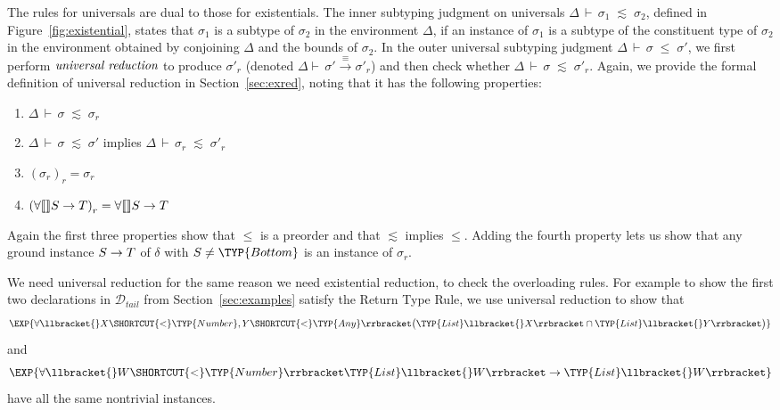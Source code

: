 \documentclass[10pt]{sigplanconf}
\newcommand{\leinner}{\ensuremath{\lesssim}}
\newcommand{\arrowtype}[2]{\mbox{\ensuremath{{#1} \rightarrow {#2}}}}
\newcommand{\ob}[1]{\ensuremath{\llbracket {#1} \rrbracket}}
\newcommand{\D}{\ensuremath{\mathcal{D}}}
\newcommand{\unitype}[2][\Delta]{\ensuremath{\forall\ob{#1}{#2}}}
\newcommand{\reduce}[1]{\ensuremath{{#1}_r}}
\newcommand{\Bottom}{\TYP{Bottom}}
\newcommand{\eqred}{\overset{\equiv}{\longrightarrow}}
\newcommand{\jgtemplate}[4][\Delta]{\ensuremath{{#1}\,\vdash\,{#2}\;{#3}\;{#4}}}
\newcommand{\jle}[3][\Delta]{\jgtemplate[#1]{#2}{\le}{#3}}
\newcommand{\jleinner}[3][\Delta]{\jgtemplate[#1]{#2}{\leinner}{#3}}
\newcommand{\jtred}[2]{\ensuremath{\Delta \vdash\,{#1} \eqred {#2}}}
\begin{document}
The rules for universals are dual to those for existentials. The inner subtyping judgment on universals $\jleinner{\sigma_1}{\sigma_2}$, defined in
Figure~\ref{fig:existential},
states that $\sigma_1$ is a subtype
of $\sigma_2$ in the environment $\Delta$, if an instance of $\sigma_1$ is a subtype of the constituent type of $\sigma_2$ in the environment obtained by conjoining $\Delta$ and the bounds of $\sigma_2$. In
the outer universal subtyping judgment $\jle{\sigma}{\sigma'}$,
we first perform $\emph{universal reduction}$ to produce $\reduce{\sigma'}$ 
(denoted \jtred{\sigma'}{\reduce{\sigma'}})
and then check whether $\jleinner{\sigma}{\reduce{\sigma'}}$. 
Again, 
we provide the formal definition of universal reduction in Section~\ref{sec:exred}, 
noting that it has the following properties:
\begin{enumerate}
\item $\jleinner{\sigma}{\reduce{\sigma}}$
\item $\jleinner{\sigma}{\sigma'}$ implies $\jleinner{\reduce{\sigma}}{\reduce{\sigma'}}$
\item $\reduce{(\reduce{\sigma})} = \reduce{\sigma}$
\item $\reduce{(\unitype[]{\arrowtype{S}{T}})} = \unitype[]{\arrowtype{S}{T}}$
\end{enumerate}
Again the first three properties show that $\le$ is a preorder and that $\leinner$ implies $\le$.
Adding the fourth property lets us show that any ground instance $\arrowtype{S}{T}$ of $\delta$ with $S \neq \Bottom$ is an instance of $\reduce{\sigma}$.

We need universal reduction for the same reason we need existential reduction, to check the overloading rules. For example to show the first two declarations in $\D_{\mathit{tail}}$
from Section~\ref{sec:examples} satisfy the Return Type Rule, we use universal reduction to show that
\[\EXP{\forall\llbracket{}X\SHORTCUT{<}\TYP{Number},Y\SHORTCUT{<}\TYP{Any}\rrbracket\bigl(\TYP{List}\llbracket{}X\rrbracket \cap \TYP{List}\llbracket{}Y\rrbracket\bigr)}\]
and
\[\EXP{\forall\llbracket{}W\SHORTCUT{<}\TYP{Number}\rrbracket\TYP{List}\llbracket{}W\rrbracket \rightarrow \TYP{List}\llbracket{}W\rrbracket}\]
have all the same nontrivial instances.

\end{document}
